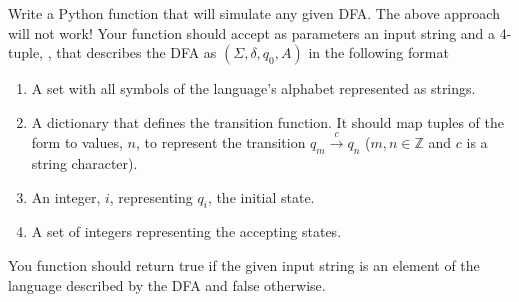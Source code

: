 \begin{problem}
Write a Python function that will simulate any given DFA.  
The above approach will not work!
Your function should accept as parameters an input string and a 4-tuple, , that describes the DFA as $(\Sigma, \delta, q_0, A)$ in the following format
\begin{enumerate}
\item A set with all symbols of the language's alphabet represented as strings.
\item A dictionary that defines the transition function.
It should map tuples of the form  to values, $n$, to represent the transition $q_m \xrightarrow{c} q_n$ ($m, n \in \mathbb{Z}$ and $c$ is a string character).
\item An integer, $i$, representing $q_i$, the initial state.
\item A set of integers representing the accepting states.
\end{enumerate}
You function should return true if the given input string is an element of the language described by the DFA and false otherwise.
\label{prob:dfa_sim}
\end{problem}

